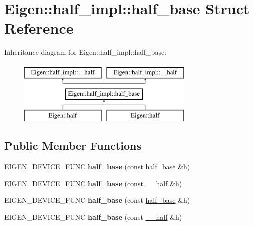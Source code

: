 \hypertarget{struct_eigen_1_1half__impl_1_1half__base}{}\section{Eigen\+:\+:half\+\_\+impl\+:\+:half\+\_\+base Struct Reference}
\label{struct_eigen_1_1half__impl_1_1half__base}
Inheritance diagram for Eigen\+:\+:half\+\_\+impl\+:\+:half\+\_\+base\+:\begin{figure}[H]
\begin{center}
\leavevmode
\includegraphics[height=3.000000cm]{struct_eigen_1_1half__impl_1_1half__base}
\end{center}
\end{figure}
\subsection*{Public Member Functions}
\begin{DoxyCompactItemize}
\item 
\mbox{\label{struct_eigen_1_1half__impl_1_1half__base_ab00b716edd079f9d19b38e97a7254db6}} 
E\+I\+G\+E\+N\+\_\+\+D\+E\+V\+I\+C\+E\+\_\+\+F\+U\+NC {\bfseries half\+\_\+base} (const \hyperlink{struct_eigen_1_1half__impl_1_1half__base}{half\+\_\+base} \&h)
\item 
\mbox{\label{struct_eigen_1_1half__impl_1_1half__base_a5da23ac716fb55724dfa84817328a381}} 
E\+I\+G\+E\+N\+\_\+\+D\+E\+V\+I\+C\+E\+\_\+\+F\+U\+NC {\bfseries half\+\_\+base} (const \hyperlink{struct_eigen_1_1half__impl_1_1____half}{\+\_\+\+\_\+half} \&h)
\item 
\mbox{\label{struct_eigen_1_1half__impl_1_1half__base_ab00b716edd079f9d19b38e97a7254db6}} 
E\+I\+G\+E\+N\+\_\+\+D\+E\+V\+I\+C\+E\+\_\+\+F\+U\+NC {\bfseries half\+\_\+base} (const \hyperlink{struct_eigen_1_1half__impl_1_1half__base}{half\+\_\+base} \&h)
\item 
\mbox{\label{struct_eigen_1_1half__impl_1_1half__base_a5da23ac716fb55724dfa84817328a381}} 
E\+I\+G\+E\+N\+\_\+\+D\+E\+V\+I\+C\+E\+\_\+\+F\+U\+NC {\bfseries half\+\_\+base} (const \hyperlink{struct_eigen_1_1half__impl_1_1____half}{\+\_\+\+\_\+half} \&h)
\end{DoxyCompactItemize}
